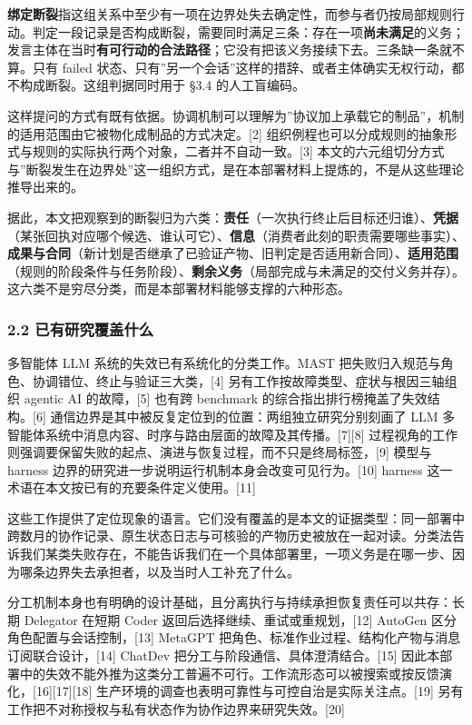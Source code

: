 \documentclass[
]{article}
\begin{document}
\textbf{绑定断裂}指这组关系中至少有一项在边界处失去确定性，而参与者仍按局部规则行动。判定一段记录是否构成断裂，需要同时满足三条：存在一项\textbf{尚未满足}的义务；发言主体在当时\textbf{有可行动的合法路径}；它没有把该义务接续下去。三条缺一条就不算。只有
failed
状态、只有''另一个会话''这样的措辞、或者主体确实无权行动，都不构成断裂。这组判据同时用于
§3.4 的人工盲编码。

这样提问的方式有既有依据。协调机制可以理解为''协议加上承载它的制品''，机制的适用范围由它被物化成制品的方式决定。{[}2{]}
组织例程也可以分成规则的抽象形式与规则的实际执行两个对象，二者并不自动一致。{[}3{]}
本文的六元组切分方式与''断裂发生在边界处''这一组织方式，是在本部署材料上提炼的，不是从这些理论推导出来的。

据此，本文把观察到的断裂归为六类：\textbf{责任}（一次执行终止后目标还归谁）、\textbf{凭据}（某张回执对应哪个候选、谁认可它）、\textbf{信息}（消费者此刻的职责需要哪些事实）、\textbf{成果与合同}（新计划是否继承了已验证产物、旧判定是否适用新合同）、\textbf{适用范围}（规则的阶段条件与任务阶段）、\textbf{剩余义务}（局部完成与未满足的交付义务并存）。这六类不是穷尽分类，而是本部署材料能够支撑的六种形态。

\subsubsection{2.2
已有研究覆盖什么}\label{ux5df2ux6709ux7814ux7a76ux8986ux76d6ux4ec0ux4e48}

多智能体 LLM 系统的失效已有系统化的分类工作。MAST
把失败归入规范与角色、协调错位、终止与验证三大类，{[}4{]}
另有工作按故障类型、症状与根因三轴组织 agentic AI 的故障，{[}5{]} 也有跨
benchmark 的综合指出排行榜掩盖了失效结构。{[}6{]}
通信边界是其中被反复定位到的位置：两组独立研究分别刻画了 LLM
多智能体系统中消息内容、时序与路由层面的故障及其传播。{[}7{]}{[}8{]}
过程视角的工作则强调要保留失败的起点、演进与恢复过程，而不只是终局标签，{[}9{]}
模型与 harness 边界的研究进一步说明运行机制本身会改变可见行为。{[}10{]}
harness 这一术语在本文按已有的充要条件定义使用。{[}11{]}

这些工作提供了定位现象的语言。它们没有覆盖的是本文的证据类型：同一部署中跨数月的协作记录、原生状态日志与可核验的产物历史被放在一起对读。分类法告诉我们某类失败存在，不能告诉我们在一个具体部署里，一项义务是在哪一步、因为哪条边界失去承担者，以及当时人工补充了什么。

分工机制本身也有明确的设计基础，且分离执行与持续承担恢复责任可以共存：长期
Delegator 在短期 Coder 返回后选择继续、重试或重规划，{[}12{]} AutoGen
区分角色配置与会话控制，{[}13{]} MetaGPT
把角色、标准作业过程、结构化产物与消息订阅联合设计，{[}14{]} ChatDev
把分工与阶段通信、具体澄清结合。{[}15{]}
因此本部署中的失效不能外推为这类分工普遍不可行。工作流形态可以被搜索或按反馈演化，{[}16{]}{[}17{]}{[}18{]}
生产环境的调查也表明可靠性与可控自治是实际关注点。{[}19{]}
另有工作把不对称授权与私有状态作为协作边界来研究失效。{[}20{]}
\end{document}
